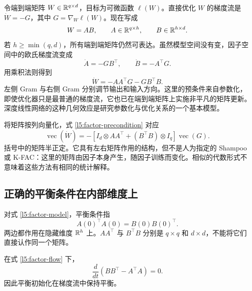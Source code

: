 令端到端矩阵 $W\in\mathbb R^{q\times d}$，目标为可微函数 $\ell(W)$。直接优化 $W$ 的梯度流是 $\dot W=-G$，其中 $G=\nabla_W\ell(W)$。现在写成
\begin{equation}
 W=AB,
 \qquad A\in\mathbb R^{q\times h},
 \qquad B\in\mathbb R^{h\times d}.
 \label{l5:factor-model}
\end{equation}
若 $h\geq\min(q,d)$，所有端到端矩阵仍然可表达。虽然模型空间没有变，因子空间中的欧氏梯度流变成
\begin{equation}
 \dot A=-GB^\top,
 \qquad \dot B=-A^\top G.
 \label{l5:factor-flow}
\end{equation}
用乘积法则得到
\begin{equation}
 \boxed{\dot W=-AA^\top G-GB^\top B}.
 \label{l5:factor-precondition}
\end{equation}
左侧 Gram 与右侧 Gram 分别调节输出和输入方向。这里的预条件来自参数化，即使优化器只是最普通的梯度流，它也已在端到端矩阵上实施非平凡的矩阵更新。深度线性网络的这种几何效应是研究参数化与优化关系的一个基本模型\citep{Arora2018,Arora2019}。

\begin{remark}[与第4讲的联系]
将矩阵按列向量化，式 \eqref{l5:factor-precondition} 对应
\[
 \operatorname{vec}(\dot W)
 =-\left[I_d\otimes AA^\top+(B^\top B)\otimes I_q\right]
 \operatorname{vec}(G).
\]
括号中的矩阵半正定。它具有左右矩阵作用的结构，但不是人为指定的 Shampoo 或 K-FAC：这里的矩阵由因子本身产生，随因子训练而变化。相似的代数形式不意味着这些方法有相同的统计解释。
\end{remark}

\subsection{正确的平衡条件在内部维度上}

\begin{definition}[两因子的平衡初始化]
对式 \eqref{l5:factor-model}，平衡条件指
\begin{equation}
 \boxed{A(0)^\top A(0)=B(0)B(0)^\top}.
 \label{l5:balanced}
\end{equation}
两边都作用在隐藏维度 $\mathbb R^h$ 上。$AA^\top$ 与 $B^\top B$ 分别是 $q\times q$ 和 $d\times d$，不能将它们直接认作同一个矩阵。
\end{definition}

\begin{proposition}
在式 \eqref{l5:factor-flow} 下，
\begin{equation}
 \frac{d}{dt}\left(BB^\top-A^\top A\right)=0.
 \label{l5:balanced-invariant}
\end{equation}
因此平衡初始化在梯度流中保持平衡。
\end{proposition}

